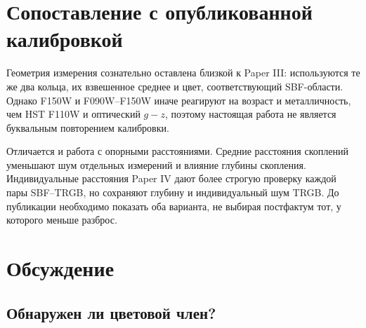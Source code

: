 \documentclass[10pt,a4paper,twocolumn]{article}
\begin{document}
\section{Сопоставление с опубликованной калибровкой}

\begin{table}
\centering
\caption{Опубликованная и предварительная калибровки. Наклоны напрямую
несопоставимы из-за разных SBF-фильтров и цветов.}
\label{tab:numerical-comparison}
\end{table}

Геометрия измерения сознательно оставлена близкой к Paper III: используются
те же два кольца, их взвешенное среднее и цвет, соответствующий SBF-области.
Однако F150W и F090W--F150W иначе реагируют на возраст и металличность, чем
HST F110W и оптический $g-z$, поэтому настоящая работа не является буквальным
повторением калибровки.

Отличается и работа с опорными расстояниями. Средние расстояния скоплений
уменьшают шум отдельных измерений и влияние глубины скопления. Индивидуальные
расстояния Paper IV дают более строгую проверку каждой пары SBF--TRGB, но
сохраняют глубину и индивидуальный шум TRGB. До публикации необходимо показать
оба варианта, не выбирая постфактум тот, у которого меньше разброс.

\section{Обсуждение}

\subsection{Обнаружен ли цветовой член?}
\end{document}
